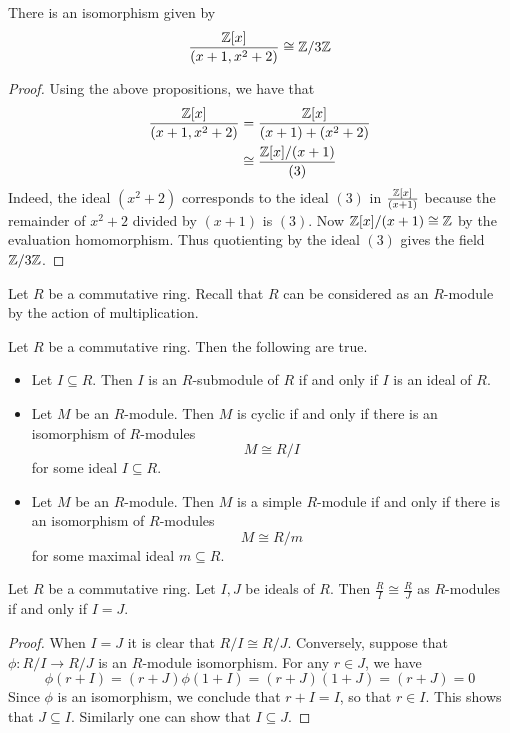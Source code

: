\documentclass[a4paper]{article}
\begin{document}
\begin{eg}{}{} There is an isomorphism given by $$\frac{\mathbb{Z}[x]}{(x+1,x^2+2)}\cong\mathbb{Z}/3\mathbb{Z}$$ \tcbline
\begin{proof}
Using the above propositions, we have that 
\begin{align*}
\frac{\mathbb{Z}[x]}{(x+1,x^2+2)}&=\frac{\mathbb{Z}[x]}{(x+1)+(x^2+2)}\\
&\cong\frac{\mathbb{Z}[x]/(x+1)}{(3)}
\end{align*}
Indeed, the ideal $(x^2+2)$ corresponds to the ideal $(3)$ in $\frac{\mathbb{Z}[x]}{(x+1)}$ because the remainder of $x^2+2$ divided by $(x+1)$ is $(3)$. Now $\mathbb{Z}[x]/(x+1)\cong\mathbb{Z}$ by the evaluation homomorphism. Thus quotienting by the ideal $(3)$ gives the field $\mathbb{Z}/3\mathbb{Z}$. 
\end{proof}
\end{eg}

Let $R$ be a commutative ring. Recall that $R$ can be considered as an $R$-module by the action of multiplication. 

\begin{prp}{}{} Let $R$ be a commutative ring. Then the following are true. 
\begin{itemize}
\item Let $I\subseteq R$. Then $I$ is an $R$-submodule of $R$ if and only if $I$ is an ideal of $R$. 
\item Let $M$ be an $R$-module. Then $M$ is cyclic if and only if there is an isomorphism of $R$-modules $$M\cong R/I$$ for some ideal $I\subseteq R$. 
\item Let $M$ be an $R$-module. Then $M$ is a simple $R$-module if and only if there is an isomorphism of $R$-modules $$M\cong R/m$$ for some maximal ideal $m\subseteq R$. 
\end{itemize}
\end{prp}

\begin{prp}{}{} Let $R$ be a commutative ring. Let $I,J$ be ideals of $R$. Then $\frac{R}{I}\cong\frac{R}{J}$ as $R$-modules if and only if $I=J$. \tcbline
\begin{proof}
When $I=J$ it is clear that $R/I\cong R/J$. Conversely, suppose that $\phi:R/I\to R/J$ is an $R$-module isomorphism. For any $r\in J$, we have $$\phi(r+I)=(r+J)\phi(1+I)=(r+J)(1+J)=(r+J)=0$$ Since $\phi$ is an isomorphism, we conclude that $r+I=I$, so that $r\in I$. This shows that $J\subseteq I$. Similarly one can show that $I\subseteq J$. 
\end{proof}
\end{prp}
\end{document}
